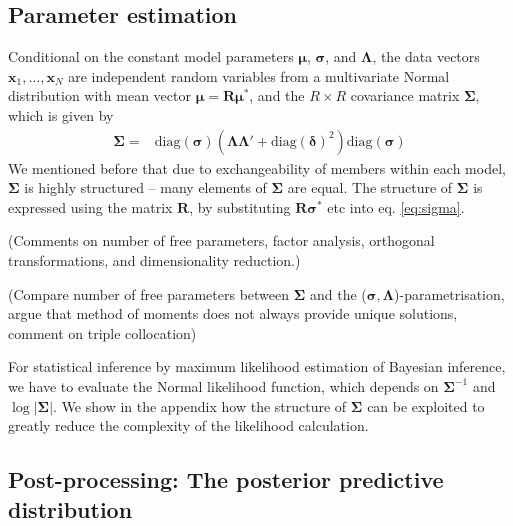 \documentclass[12pt]{article}
\renewcommand{\vec}[1]{\bm{#1}}
\newcommand{\mat}[1]{\bm{#1}}
\newcommand{\diag}{\text{diag}}
\begin{document}
\subsection{Parameter estimation}

Conditional on the constant model parameters $\vec{\mu}$, $\vec{\sigma}$, and $\mat{\Lambda}$, the data vectors $\vec{x}_1,\dots,\vec{x}_N$ are independent random variables from a multivariate Normal distribution with mean vector $\vec{\mu}=\mat{R}\vec{\mu}^*$, and the $R\times R$ covariance matrix $\mat{\Sigma}$, which is given by
%
\begin{align}
\mat{\Sigma} = & \diag(\vec{\sigma}) \left( \mat{\Lambda} \mat{\Lambda}' + \diag(\vec{\delta})^2 \right) \diag(\vec{\sigma})
\label{eq:sigma}
\end{align}
%
We mentioned before that due to exchangeability of members within each model, $\mat{\Sigma}$ is highly structured -- many elements of $\mat{\Sigma}$ are equal.
The structure of $\mat{\Sigma}$ is expressed using the matrix $\mat{R}$, by substituting $\mat{R}\vec{\sigma}^*$ etc into eq. \ref{eq:sigma}.
%


(Comments on number of free parameters, factor analysis, orthogonal transformations, and dimensionality reduction.)

(Compare number of free parameters between $\mat{\Sigma}$ and the ($\vec{\sigma}, \mat{\Lambda}$)-parametrisation, argue that method of moments does not always provide unique solutions, comment on triple collocation)


For statistical inference by maximum likelihood estimation of Bayesian inference, we have to evaluate the Normal likelihood function, which depends on $\mat{\Sigma}^{-1}$ and $\log|\mat{\Sigma}|$.
We show in the appendix how the structure of $\mat{\Sigma}$ can be exploited to greatly reduce the complexity of the likelihood calculation.


\subsection{Post-processing: The posterior predictive distribution}
\end{document}
